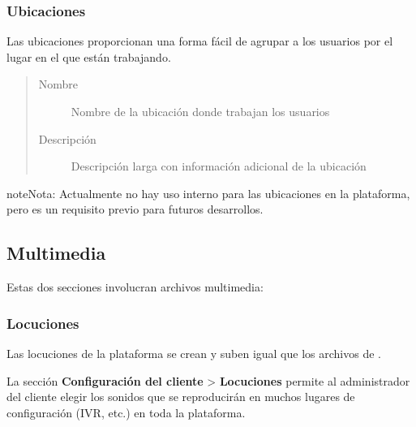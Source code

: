 \documentclass[letterpaper,10pt,spanish]{sphinxmanual}
\begin{document}
\subsubsection{Ubicaciones}
\label{administration_portal/client/vpbx/user_configuration/locations::doc}\label{administration_portal/client/vpbx/user_configuration/locations:locations}
Las ubicaciones proporcionan una forma fácil de agrupar a los usuarios por el lugar en el que están trabajando.
\begin{quote}
\begin{description}
\item[{Nombre}] \leavevmode
Nombre de la ubicación donde trabajan los usuarios

\item[{Descripción}] \leavevmode
Descripción larga con información adicional de la ubicación

\end{description}
\end{quote}

\begin{notice}{note}{Nota:}
Actualmente no hay uso interno para las ubicaciones en la plataforma, pero es un requisito previo para futuros desarrollos.
\end{notice}


\subsection{Multimedia}
\label{administration_portal/client/vpbx/multimedia/index:multimedia}\label{administration_portal/client/vpbx/multimedia/index::doc}
Estas dos secciones involucran archivos multimedia:


\subsubsection{Locuciones}
\label{administration_portal/client/vpbx/multimedia/locutions:locutions}\label{administration_portal/client/vpbx/multimedia/locutions::doc}
Las locuciones de la plataforma se crean y suben igual que los archivos de {\hyperref[administration_portal/client/vpbx/multimedia/music_on_hold:musiconhold]{}}.

La sección \textbf{Configuración del cliente} \textgreater{} \textbf{Locuciones} permite al administrador del cliente elegir los sonidos que se reproducirán en muchos lugares de configuración (IVR, etc.) en toda la plataforma.
\end{document}
